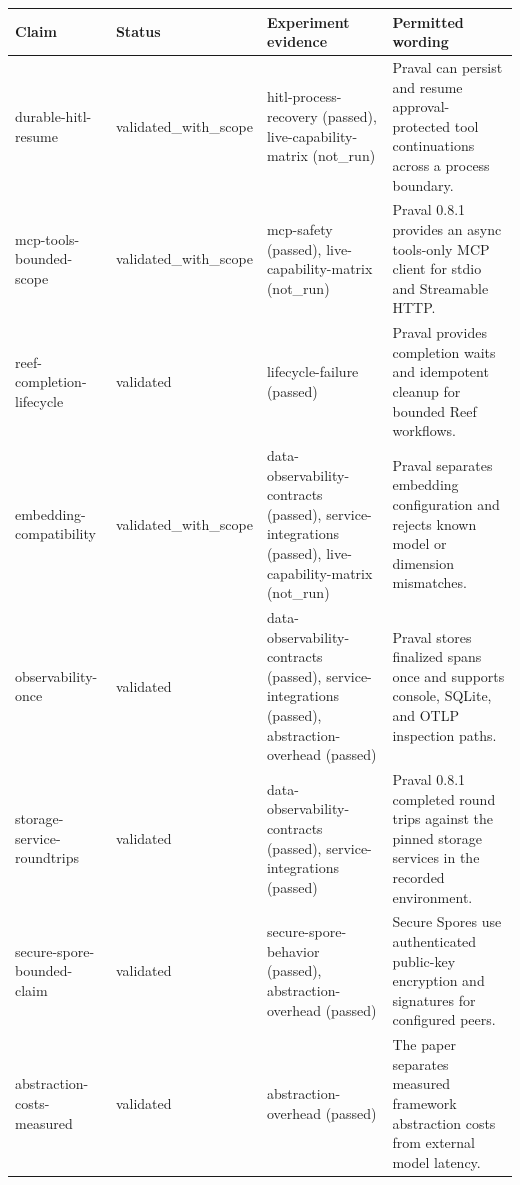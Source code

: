 \begin{tabular}{llll}
\hline
Claim & Status & Experiment evidence & Permitted wording \\
\hline
durable-hitl-resume & validated\_with\_scope & hitl-process-recovery (passed), live-capability-matrix (not\_run) & Praval can persist and resume approval-protected tool continuations across a process boundary. \\
mcp-tools-bounded-scope & validated\_with\_scope & mcp-safety (passed), live-capability-matrix (not\_run) & Praval 0.8.1 provides an async tools-only MCP client for stdio and Streamable HTTP. \\
reef-completion-lifecycle & validated & lifecycle-failure (passed) & Praval provides completion waits and idempotent cleanup for bounded Reef workflows. \\
embedding-compatibility & validated\_with\_scope & data-observability-contracts (passed), service-integrations (passed), live-capability-matrix (not\_run) & Praval separates embedding configuration and rejects known model or dimension mismatches. \\
observability-once & validated & data-observability-contracts (passed), service-integrations (passed), abstraction-overhead (passed) & Praval stores finalized spans once and supports console, SQLite, and OTLP inspection paths. \\
storage-service-roundtrips & validated & data-observability-contracts (passed), service-integrations (passed) & Praval 0.8.1 completed round trips against the pinned storage services in the recorded environment. \\
secure-spore-bounded-claim & validated & secure-spore-behavior (passed), abstraction-overhead (passed) & Secure Spores use authenticated public-key encryption and signatures for configured peers. \\
abstraction-costs-measured & validated & abstraction-overhead (passed) & The paper separates measured framework abstraction costs from external model latency. \\
\hline
\end{tabular}
